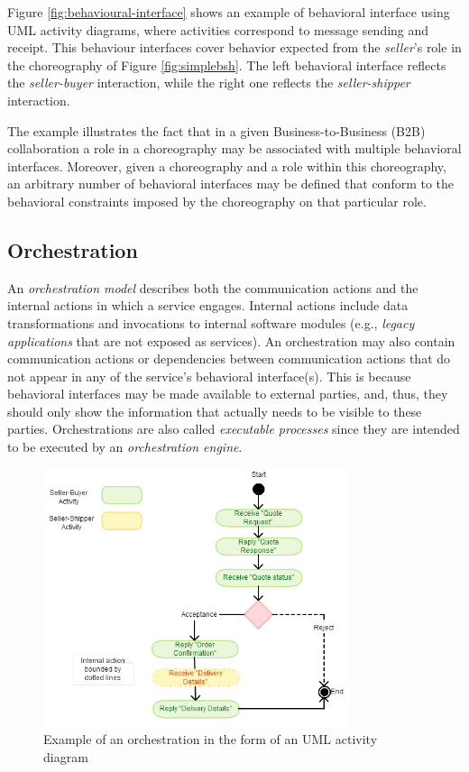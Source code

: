 Figure \ref{fig:behavioural-interface} shows an example of behavioral interface using UML activity diagrams, where activities correspond to message sending and receipt. This behaviour interfaces cover behavior expected from the \textit{seller}'s role in the choreography of Figure \ref{fig:simplebsh}. The left behavioral interface reflects the \textit{seller-buyer }interaction, while the right one reflects the \textit{seller-shipper }interaction. 

The example illustrates the fact that in a given Business-to-Business (B2B) collaboration a role in a choreography may be associated with multiple behavioral interfaces. Moreover, given a choreography and a role within this choreography, an arbitrary number of behavioral interfaces may be defined that conform to the behavioral constraints imposed by the choreography on that particular role.

\subsection{Orchestration}

An \textit{orchestration model }describes both the communication actions and the internal actions in which a service engages. Internal actions include data transformations and invocations to internal software modules (e.g., \textit{legacy applications }that are not exposed as services). An orchestration may also contain communication actions or dependencies between communication actions that do not appear in any of the service's behavioral interface(s). This is because behavioral interfaces may be made available to external parties, and, thus, they should only show the information that actually needs to be visible to these parties. Orchestrations are also called \textit{executable processes }since they are intended to be executed by an \textit{orchestration engine}.

\begin{figure}
\centering
\includegraphics[width=0.8\textwidth]{resources/orchestration_internal_action.png}
\caption{Example of an orchestration in the form of an UML activity diagram}
\label{fig:orchestration-internal-action}
\end{figure}


